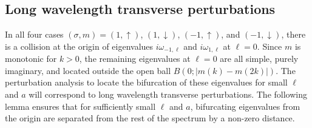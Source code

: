 \documentclass[12pt]{amsart}    %
\newcommand{\oneu}{(1,\uparrow)}
\newcommand{\oned}{(1,\downarrow)}
\newcommand{\minu}{(-1,\uparrow)}
\newcommand{\mind}{(-1,\downarrow)}
\numberwithin{equation}{section}
\begin{document}



\subsection{Long wavelength transverse perturbations}
In all four cases $(\sigma,m)=\oneu$, $\oned$, $\minu$, and $\mind$, there is a collision at the origin of eigenvalues $i\omega_{-1,\ell}$ and $i\omega_{1,\ell}$ at $\ell=0$. Since $m$ is monotonic for $k>0$, the remaining eigenvalues at $\ell=0$ are all simple, purely imaginary, and located outside the open ball $B(0;|m(k)-m(2k)|)$. The perturbation analysis to locate the bifurcation of these eigenvalues for small $\ell$ and $a$ will correspond to long wavelength transverse perturbations. The following lemma ensures that for sufficiently small $\ell$ and $a$, bifurcating eigenvalues from the origin are separated from the rest of the spectrum by a non-zero distance.
\end{document}
